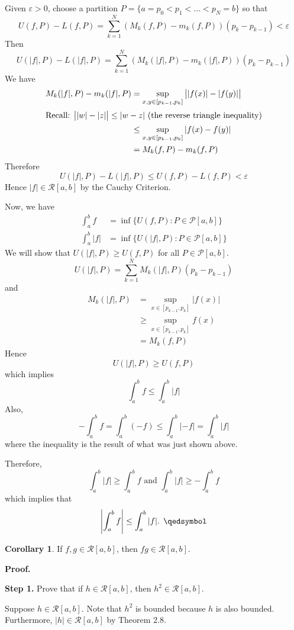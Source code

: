 \documentclass[11pt]{article}
\theoremstyle{definition}
\newtheorem{cor}[thm]{Corollary}
\begin{document}
Given $\varepsilon > 0$, choose a partition $P = \{a = p_0 < p_1 < \dots < p_N = b\}$ so that
$$ U(f, P) - L(f, P) = \sum_{k=1}^N \left(M_k(f, P) - m_k(f, P)\right)(p_k - p_{k-1}) < \varepsilon $$
Then 
$$U(|f|, P) - L(|f|, P) = \sum_{k=1}^N \left(M_k(|f|, P) - m_k(|f|, P)\right)(p_k - p_{k-1})$$
We have
\begin{align*}
M_k(|f|, P) - m_k(|f|, P) & = \sup_{x, y \in [p_{k-1}, p_k]} \left||f(x)| - |f(y)|\right| \\
\intertext{Recall: $\left||w| - |z|\right| \leq |w-z|$ (the reverse triangle inequality)}
& \leq \sup_{x, y \in [p_{k-1}, p_k]} |f(x) - f(y)| \\
& = M_k(f, P) - m_k(f, P)
\end{align*}
Therefore
$$U(|f|, P) - L(|f|, P) \leq U(f, P) - L(f, P) < \varepsilon$$
Hence $|f| \in \mathcal{R}[a, b]$ by the Cauchy Criterion. 

Now, we have
\begin{align*}
\int_a^b f & = \inf \{U(f, P) : P \in \mathcal{P}[a, b]\} \\
\int_a^b |f| & = \inf \{U(|f|, P) : P \in \mathcal{P}[a, b]\}
\end{align*}
We will show that $U(|f|, P) \geq U(f, P)$ for all $P \in \mathcal{P}[a, b]$. 
$$U(|f|, P) = \sum_{k=1}^N M_k (|f|, P) (p_k - p_{k-1})$$
and
\begin{align*}
M_k(|f|, P) & = \sup_{x \in [p_{k-1}, p_k]} |f(x)| \\
& \geq \sup_{x \in [p_{k-1}, p_k]} f(x) \\
& = M_k(f, P)
\end{align*}
Hence $$U(|f|, P) \geq U(f, P)$$
which implies
$$\int_a^b f \leq \int_a^b |f|$$
Also,
$$-\int_a^b f = \int_a^b (-f) \leq \int_a^b |-f| = \int_a^b |f|$$
where the inequality is the result of what was just shown above. 

Therefore,
$$\int_a^b |f| \geq \int_a^b f \text{ and } \int_a^b |f| \geq -\int_a^b f$$
which implies that
$$\left|\int_a^b f \right| \leq \int_a^b |f| \text{. } \qedsymbol$$

\begin{cor}
If $f, g \in \mathcal{R}[a, b]$, then $fg \in \mathcal{R}[a, b]$.
\end{cor}
\textbf{Proof.} 

\textbf{Step 1.} Prove that if $h \in \mathcal{R}[a, b]$, then $h^2 \in \mathcal{R}[a, b]$. 

Suppose $h \in \mathcal{R}[a, b]$. Note that $h^2$ is bounded because $h$ is also bounded. Furthermore, $|h| \in \mathcal{R}[a, b]$ by Theorem 2.8. 
\end{document}

